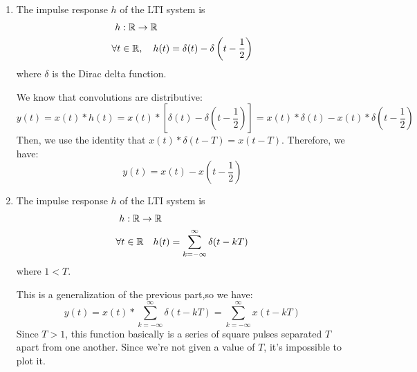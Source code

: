 \documentclass[10pt]{article}
\begin{document}
\begin{enumerate}[label=\alph*)]
\begin{solution}
\begin{center}
				\end{center}
			\end{solution}
		\item The impulse response \( h \) of the LTI system is 
			\begin{align*}
				h&: \mathbb R \to \mathbb R\\
				\forall t &\in \mathbb R, \ \ \ h(t) = \delta(t) - \delta\left( t - \frac{1}{2} \right) 
			\end{align*}
			where \( \delta \) is the Dirac delta function.

			\begin{solution}
				We know that convolutions are distributive: 
				\[
				y(t) = x(t) * h(t) = x(t) * \left[ \delta(t) - \delta\left( t - \frac{1}{2} \right)  \right] 
				= x(t) * \delta(t) - x(t) * \delta\left( t - \frac{1}{2} \right) 
				\] 
				Then, we use the identity that \( x(t) * \delta(t - T) = x(t - T) \). Therefore, we have: 
				\[
				y(t) = x(t) - x\left(t - \frac{1}{2}\right)
				\] 
			\end{solution}
		\item The impulse response \( h \) of the LTI system is 
			\begin{align*}
				h&: \mathbb R \to \mathbb R\\
				\forall t &\in \mathbb R \ \ \ h(t) = \sum_{k = -\infty}^{\infty}\delta (t - kT)
			\end{align*}
			where \( 1 < T \). 

			\begin{solution}
				This is a generalization of the previous part,so we have: 
				\[
				y(t) = x(t) * \sum_{k = -\infty}^{\infty} \delta(t - kT) = \sum_{k = -\infty}^{\infty}x(t - kT)
				\] 
				Since \( T > 1 \), this function basically is a series of square pulses separated \( T \) apart 
				from one another. Since we're not given a value of \( T \), it's impossible to plot it. 
			\end{solution}
	\end{enumerate}
	\pagebreak
\end{document}
